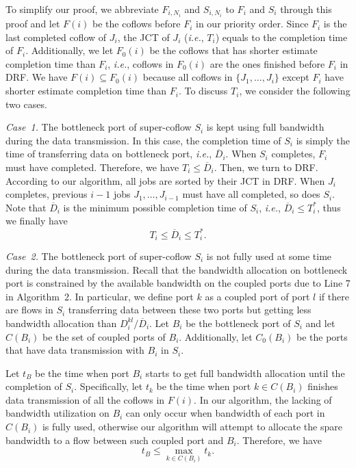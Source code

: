 \documentclass[10pt, conference, letterpaper]{IEEEtran}
\begin{document}
\begin{IEEEproof}
To simplify our proof, we abbreviate $F_{i,N_i}$ and $S_{i,N_i}$ to $F_i$ and $S_i$ through this proof and let $F(i)$ be the coflows before $F_i$ in our priority order. Since $F_i$ is the last completed coflow of $J_i$, the JCT of $J_i$ (\emph{i.e.}, $T_i$) equals to the completion time of $F_i$. Additionally, we let $F_0(i)$ be the coflows that has shorter estimate completion time than $F_i$, \emph{i.e.}, coflows in $F_0(i)$ are the ones finished before $F_i$ in DRF. We have $F(i) \subseteq F_0(i)$ because all coflows in $\{J_1,\dots,J_i\}$ except $F_i$ have shorter estimate completion time than $F_i$. To discuss $T_i$, we consider the following two cases.

\emph{Case~1.} The bottleneck port of super-coflow $S_i$ is kept using full bandwidth during the data transmission. In this case, the completion time of $S_i$ is simply the time of transferring data on bottleneck port, \emph{i.e.}, $\overline{D}_i$. When $S_i$ completes, $F_i$ must have completed. Therefore, we have $T_i \leq \overline{D}_i$. Then, we turn to DRF. According to our algorithm, all jobs are sorted by their JCT in DRF. When $J_i$ completes, previous $i-1$ jobs $J_1,\dots,J_{i-1}$ must have all completed, so does $S_i$. Note that $\overline{D}_i$ is the minimum possible completion time of $S_i$, \emph{i.e.}, $\overline{D}_i \leq T_i^*$, thus we finally have
\begin{equation}\label{case1}
	T_i \leq \overline{D}_i \leq T_i^*.
\end{equation}

\emph{Case~2.} The bottleneck port of super-coflow $S_i$ is not fully used at some time during the data transmission. Recall that the bandwidth allocation on bottleneck port is constrained by the available bandwidth on the coupled ports due to Line 7 in Algorithm~2. In particular, we define port $k$ as a coupled port of port $l$ if there are flows in $S_i$ transferring data between these two ports but getting less bandwidth allocation than $D_i^{kl}/\overline{D}_i$. Let $B_i$ be the bottleneck port of $S_i$ and let $C(B_i)$ be the set of coupled ports of $B_i$. Additionally, let $C_0(B_i)$ be the ports that have data transmission with $B_i$ in $S_i$.

Let $t_B$ be the time when port $B_i$ starts to get full bandwidth allocation until the completion of $S_i$. Specifically, let $t_k$ be the time when port $k$$\in$$C(B_i)$ finishes data transmission of all the coflows in $F(i)$. In our algorithm, the lacking of bandwidth utilization on $B_i$ can only occur when bandwidth of each port in $C(B_i)$ is fully used, otherwise our algorithm will attempt to allocate the spare bandwidth to a flow between such coupled port and $B_i$. Therefore, we have
\begin{equation}
	t_B \leq \max_{k \in C(B_i)} t_k.
\end{equation}


\end{IEEEproof}
\end{document}
